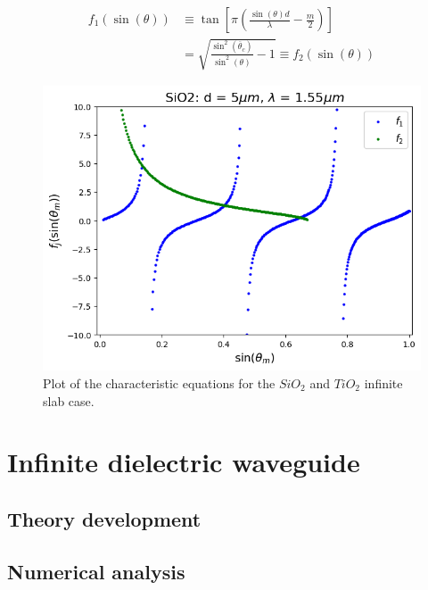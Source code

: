 \documentclass[conference, a4paper]{IEEEtran}
\begin{document}
\begin{equation}
    \begin{split}
        f_1(\sin(\theta)) 
        &\equiv \tan\left[ \pi \left(\frac{\sin(\theta) d}{\lambda} - \frac{m}{2}\right) \right] \\
        &= \sqrt{\frac{\sin^2(\overline{\theta}_c)}{\sin^2(\theta)} - 1} \equiv f_2(\sin(\theta))
    \end{split}
    \label{eq:char_equation}
\end{equation}


\begin{figure}[H]
    \centering
    \centering
    \includegraphics[scale=0.4]{modes_SiO2_d5um_wv1.55um.png}
    \caption{$SiO_2$.}
    \caption{Plot of the characteristic equations for the $SiO_2$ and $TiO_2$ infinite slab case.}
    \label{fig:char_equation}
\end{figure}




\section{Infinite dielectric waveguide}
\label{sec:slab}

\subsection{Theory development}
\label{subsec:slab_theory}

\subsection{Numerical analysis}
\label{subsec:slab_num}
\end{document}
